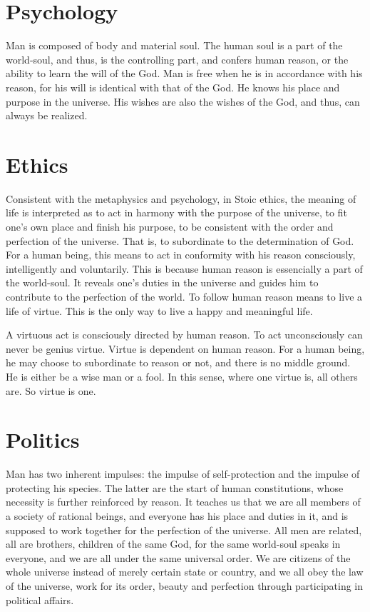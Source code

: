 \documentclass[11pt]{article}
\begin{document}
\section{Psychology}
Man is composed of body and material soul. 
The human soul is a part of the world-soul, and thus, is the controlling part, and confers human reason, or the ability to learn the will of the God. 
Man is free when he is in accordance with his reason, for his will is identical with that of the God. 
He knows his place and purpose in the universe. 
His wishes are also the wishes of the God, and thus, can always be realized.

\section{Ethics}
Consistent with the metaphysics and psychology, in Stoic ethics, the meaning of life is interpreted as to act in harmony with the purpose of the universe, to fit one’s own place and finish his purpose, to be consistent with the order and perfection of the universe. 
That is, to subordinate to the determination of God. 
For a human being, this means to act in conformity with his reason consciously, intelligently and voluntarily. 
This is because human reason is essencially a part of the world-soul. 
It reveals one’s duties in the universe and guides him to contribute to the perfection of the world. 
To follow human reason means to live a life of virtue. 
This is the only way to live a happy and meaningful life.

\newline

A virtuous act is consciously directed by human reason. 
To act unconsciously can never be genius virtue. 
Virtue is dependent on human reason. 
For a human being, he may choose to subordinate to reason or not, and there is no middle ground. 
He is either be a wise man or a fool. 
In this sense, where one virtue is, all others are. 
So virtue is one.

\section{Politics}
Man has two inherent impulses: 
the impulse of self-protection and the impulse of protecting his species. 
The latter are the start of human constitutions, whose necessity is further reinforced by reason. 
It teaches us that we are all members of a society of rational beings, and everyone has his place and duties in it, and is supposed to work together for the perfection of the universe. 
All men are related, all are brothers, children of the same God, for the same world-soul speaks in everyone, and we are all under the same universal order. 
We are citizens of the whole universe instead of merely certain state or country, and we all obey the law of the universe, work for its order, beauty and perfection through participating in political affairs.
  
\end{document}
